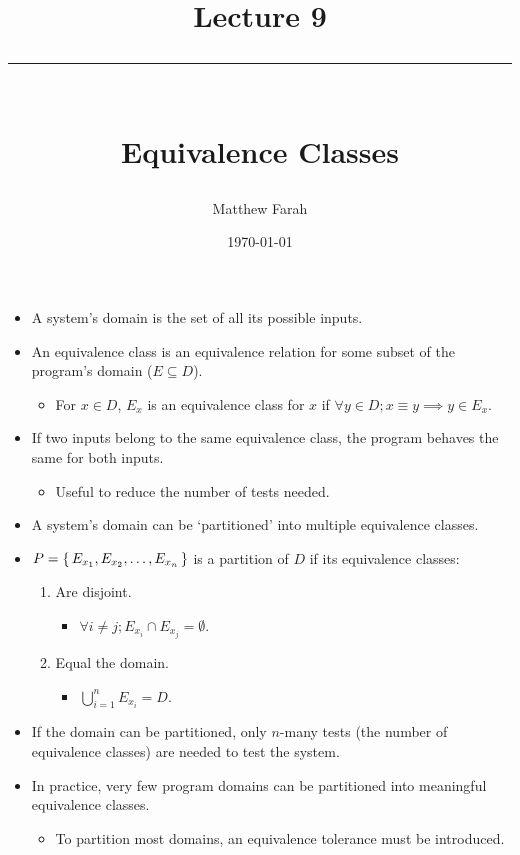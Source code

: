 \documentclass{article}
\date{
	\vspace{-.75em}
	{\large \today}
}
\title{
	\vspace*{-1.5em}
	{\Huge Lecture 9} \\
	\vspace{-1em}
	\rule{\textwidth/4}{.01em} \\
	\vspace{-.25em}
	{\Large Equivalence Classes}
	\vspace{-.75em}
}
\author{
	{\large Matthew Farah}
}
\begin{document}
\maketitle
\pagestyle{fancy}

\fi

\begin{itemize}
	\item A system's domain is the set of all its possible inputs.
	\item An equivalence class is an equivalence relation for some subset of the program's domain ($E \subseteq D$).
	\begin{itemize}
		\item For $x \in D$, $E_x$ is an equivalence class for $x$ if $\forall y \in D; x \equiv y \implies y \in E_x$.
	\end{itemize}
	\item If two inputs belong to the same equivalence class, the program behaves the same for both inputs.
	\begin{itemize}
		\item Useful to reduce the number of tests needed.
	\end{itemize}
	\item A system's domain can be `partitioned' into multiple equivalence classes.
	\item $P = \set{E_{x_{1}}, E_{x_{2}}, \ldots, E_{x_{n}}}$ is a partition of $D$ if its equivalence classes:
	\begin{enumerate}
		\item Are disjoint.
		\begin{itemize}
			\item $\forall i \neq j; E_{x_{i}} \cap E_{x_{j}} = \emptyset$.
		\end{itemize}
		\item Equal the domain.
		\begin{itemize}
			\item $\bigcup_{i = 1}^{n} E_{x_{i}} = D$.
		\end{itemize}
	\end{enumerate}
	\item If the domain can be partitioned, only $n$-many tests (the number of equivalence classes) are needed to test the system.
	\item In practice, very few program domains can be partitioned into meaningful equivalence classes.
	\begin{itemize}
		\item To partition most domains, an equivalence tolerance must be introduced.

\end{itemize}
\end{itemize}
\end{document}
